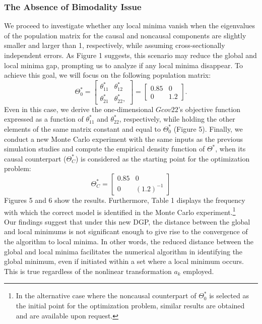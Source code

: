 \documentclass[<1p>]{elsarticle} %
\begin{document}
\subsubsection{\textbf{The Absence of Bimodality Issue}}
We proceed to investigate whether any local minima vanish when the eigenvalues of the population matrix for the causal and noncausal components are slightly smaller and larger than 1, respectively, while assuming cross-sectionally independent errors. As Figure 1 suggests, this scenario may reduce the global and local minima gap, prompting us to analyze if any local minima disappear. To achieve this goal, we will focus on the following population matrix:
\begin{equation}
\Theta_{0}^{*}=\begin{bmatrix}
\theta_{11}^{*} & \theta_{12}^{*}\\
\theta_{21}^{*} & \theta_{22}^{*},
\end{bmatrix}=\begin{bmatrix}
0.85 & 0\\
0 & 1.2
\end{bmatrix}.
\end{equation}
Even in this case, we derive the one-dimensional $Gcov22$'s objective function expressed as a function of $\theta_{11}^{*}$ and $\theta_{22}^{*}$, respectively, while holding the other elements of the same matrix constant and equal to $\Theta_0^*$ (Figure 5). Finally, we conduct a new Monte Carlo experiment with the same inputs as the previous simulation studies and compute the empirical density function of $\Theta^{*}$, when its causal counterpart ($\Theta_{C}^{*}$) is considered as the starting point for the optimization problem:
\begin{equation*}
\Theta_{C}^{*}=\begin{bmatrix}
0.85 & 0\\
0 & (1.2)^{-1}
\end{bmatrix}
\end{equation*}
Figures 5 and 6 show the results. Furthermore, Table 1 displays the frequency with which the correct model is identified in the Monte Carlo experiment.\footnote{In the alternative case where the noncausal counterpart of $\Theta_0^{*}$ is selected as the initial point for the optimization problem, similar results are obtained and are available upon request.}\\
\indent Our findings suggest that under this new DGP, the distance between the global and local minimums is not significant enough to give rise to the convergence of the algorithm to local minima. In other words, the reduced distance between the global and local minima facilitates the numerical algorithm in identifying the global minimum, even if initiated within a set where a local minimum occurs. This is true regardless of the nonlinear transformation $a_k$ employed. 
\end{document}
